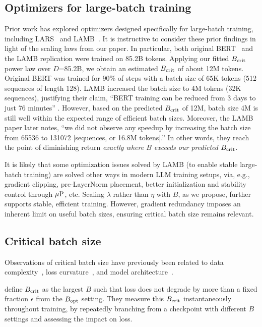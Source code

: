 \subsection{Optimizers for large-batch training}

Prior work has explored optimizers designed specifically for
large-batch training, including LARS~\citep{you2017large} and
LAMB~\citep{you2019large}.  It is instructive to consider these prior
findings in light of the scaling laws from our paper.
%
In particular, both original BERT~\citep{devlin2019bert} and the LAMB
replication were trained on 85.2B tokens.  Applying our fitted
$B_{\text{crit}}$ power law over $D$=85.2B, we obtain an estimated $B_{\text{crit}}$ of
about 12M tokens.  Original BERT was trained for 90\% of steps with a
batch size of 65K tokens (512 sequences of length 128).  LAMB
increased the batch size to 4M tokens (32K sequences), justifying
their claim, ``BERT training can be reduced from 3 days to just 76
minutes'' \citep{you2019large}.  However, based on the predicted
$B_{\text{crit}}$ of 12M, batch size 4M is still well within the expected range
of efficient batch sizes. Moreover, the LAMB paper later notes, ``we
did not observe any speedup by increasing the batch size from 65536 to
131072 [sequences, or 16.8M tokens].''  In other words, they reach the
point of diminishing return \emph{exactly where $B$ exceeds our
predicted $B_{\text{crit}}$}.

It is likely that some optimization issues solved by LAMB (to enable
stable large-batch training) are solved other ways in modern LLM
training setups, via, e.g., gradient clipping, pre-LayerNorm
placement, better initialization and stability control through $\mbox{$\mu$P}$,
etc.  Scaling $\lambda$ rather than $\eta$ with $B$, as we propose,
further supports stable, efficient training. However, gradient
redundancy imposes an inherent limit on useful batch sizes, ensuring
critical batch size remains relevant.

\subsection{Critical batch size}\label{sec:app_bcrit}

Observations of critical batch size have previously been related to
data complexity~\citep{golmant2018computational}, loss
curvature~\citep{ma2018power,zhang2019algorithmic}, and model
architecture~\citep{shallue2019measuring}.

\citet{merrill2025critical} define $B_{\text{crit}}$ as the largest $B$ such
that loss does not degrade by more than a fixed fraction $\epsilon$
from the $B_{\text{opt}}$ setting.  They measure this $B_{\text{crit}}$ instantaneously
throughout training, by repeatedly branching from a checkpoint with
different $B$ settings and assessing the impact on loss.


